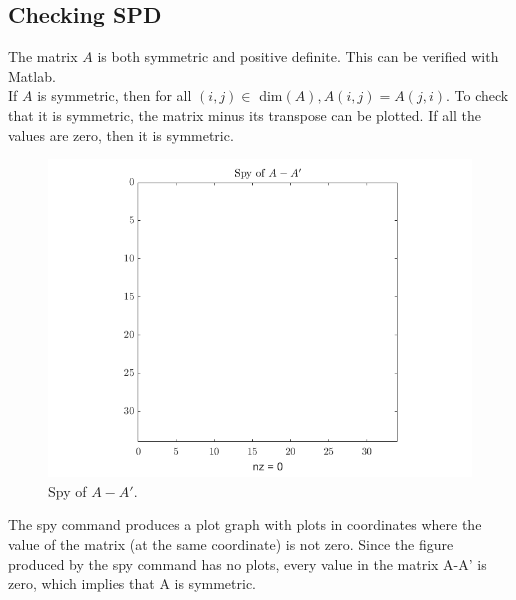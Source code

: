 \documentclass[12pt,a4paper]{article}
\begin{document}
\subsection{Checking SPD}
The matrix $A$ is both symmetric and positive definite. This can be verified with Matlab.\\If $A$ is symmetric, then for all $(i, j)\in$ dim$(A), A(i, j) = A(j, i)$. To check that it is symmetric, the matrix minus its transpose can be plotted. If all the values are zero, then it is symmetric.
\begin{figure}[H]
	\includegraphics[width=\linewidth]{images/spySymmetric.png}
	\caption{Spy of $A-A'$.}
	\label{fig:spySymmetric}
\end{figure}
The spy command produces a plot graph with plots in coordinates where the value of the matrix (at the same coordinate) is not zero. Since the figure produced by the spy command has no plots, every value in the matrix A-A' is zero, which implies that A is symmetric.
\end{document}
